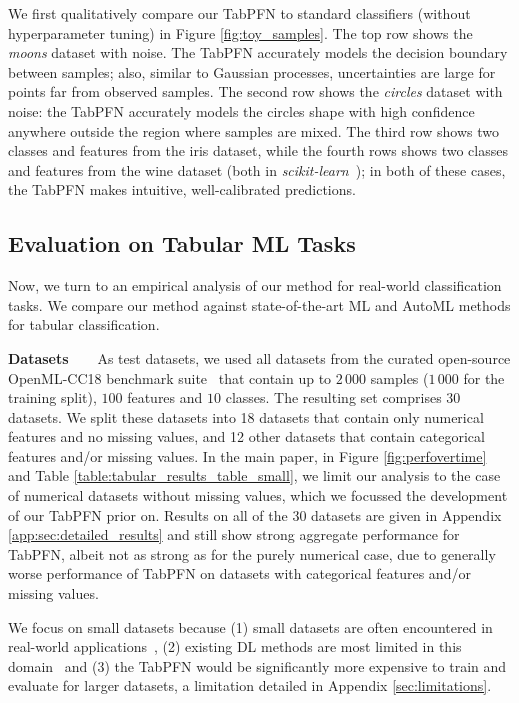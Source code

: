 We first qualitatively compare our TabPFN to standard classifiers (without hyperparameter tuning) in Figure \ref{fig:toy_samples}.
The top row shows the \emph{moons} dataset with noise. The TabPFN accurately models the decision boundary between samples; also, similar to Gaussian processes, uncertainties are large for points far from observed samples. The second row shows the \emph{circles} dataset with noise: the TabPFN accurately models the circle\textquotesingle{}s shape with high confidence anywhere outside the region where samples are mixed. The third row shows two classes and features from the iris dataset, while the fourth rows shows two classes and features from the wine dataset (both in \emph{scikit-learn}~\citep{scikit-learn}); in both of these cases, the TabPFN makes intuitive, well-calibrated predictions.

\subsection{Evaluation on Tabular ML Tasks}\label{ssec:tabresults}

Now, we turn to an empirical analysis of our method for real-world classification tasks. We compare our method against state-of-the-art ML and AutoML methods for tabular classification.

\textbf{Datasets~~~} As test datasets, we used all datasets from the curated open-source OpenML-CC18 benchmark suite~\citep{bischl-neuripsdbt21a} that contain up to $2\,000$ samples ($1\,000$ for the training split), $100$ features and $10$ classes. The resulting set comprises $30$ datasets. We split these datasets into 18 datasets that contain only numerical features and no missing values, and 12 other datasets that contain categorical features and/or missing values. In the main paper, in Figure \ref{fig:perfovertime} and Table \ref{table:tabular_results_table_small}, we limit our analysis to the case of numerical datasets without missing values, which we focussed the development of our TabPFN prior on. Results on all of the 30 datasets are given in Appendix \ref{app:sec:detailed_results} and still show strong aggregate performance for TabPFN, albeit not as strong as for the purely numerical case, due to generally worse performance of TabPFN on datasets with categorical features and/or missing values. 

We focus on small datasets because (1) small datasets are often encountered in real-world applications~\citep{dua_2019}, (2) existing DL methods are most limited in this domain~\citep{grinsztajn2022why} and (3) the TabPFN would be significantly more expensive to train and evaluate for larger datasets, a limitation detailed in Appendix \ref{sec:limitations}.

